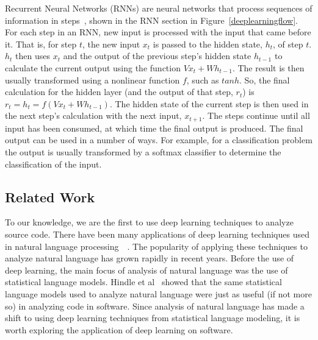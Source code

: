 Recurrent Neural Networks (RNNs) are neural networks that process sequences of information in steps~\cite{elman1990finding}, shown in the RNN section in Figure~\ref{deeplearningflow}. For each step in an RNN, new input is processed with the input that came before it. That is, for step $t$, the new input $x_t$ is passed to the hidden state, $h_t$, of step $t$. $h_t$ then uses $x_t$ and the output of the previous step's hidden state $h_{t-1}$ to calculate the current output using the function $Vx_t + Wh_{t-1}$. The result is then usually transformed using a nonlinear function $f$, such as $tanh$. So, the final calculation for the hidden layer (and the output of that step, $r_t$) is $r_t = h_t = f(Vx_t + Wh_{t-1})$. The hidden state of the current step is then used in the next step's calculation with the next input, $x_{t+1}$. The steps continue until all input has been consumed, at which time the final output is produced. The final output can be used in a number of ways. For example, for a classification problem the output is usually transformed by a softmax classifier to determine the classification of the input. 

\subsection{Related Work}

To our knowledge, we are the first to use deep learning techniques to analyze source code. There have been many applications of deep learning techniques used in natural language processing~\cite{collobert2008unified}~\cite{glorot2011domain}. The popularity of applying these techniques to analyze natural language has grown rapidly in recent years. Before the use of deep learning, the main focus of analysis of natural language was the use of statistical language models. Hindle et al~\cite{hindle2012naturalness} showed that the same statistical language models used to analyze natural language were just as useful (if not more so) in analyzing code in software. Since analysis of natural language has made a shift to using deep learning techniques from statistical language modeling, it is worth exploring the application of deep learning on software.

